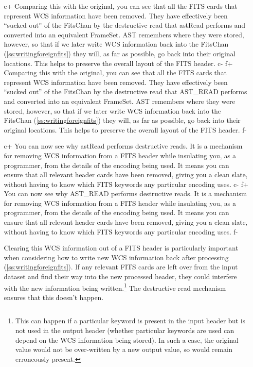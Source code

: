 \documentclass[twoside,11pt]{article}
\newcommand{\secref}[1]{\S\ref{#1}}
\renewcommand{\secref}[1]{\ref{#1}}
\begin{document}
c+
Comparing this with the original, you can see that all the FITS cards
that represent WCS information have been removed. They have
effectively been ``sucked out'' of the FitsChan by the destructive
read that astRead performs and converted into an equivalent
FrameSet. AST remembers where they were stored, however, so that if we
later write WCS information back into the FitsChan
(\secref{ss:writingforeignfits}) they will, as far as possible, go
back into their original locations. This helps to preserve the overall
layout of the FITS header.
c-
f+
Comparing this with the original, you can see that all the FITS cards
that represent WCS information have been removed. They have
effectively been ``sucked out'' of the FitsChan by the destructive
read that AST\_READ performs and converted into an equivalent
FrameSet. AST remembers where they were stored, however, so that if we
later write WCS information back into the FitsChan
(\secref{ss:writingforeignfits}) they will, as far as possible, go
back into their original locations.  This helps to preserve the
overall layout of the FITS header.
f-

c+
You can now see why astRead performs destructive reads. It is a
mechanism for removing WCS information from a FITS header while
insulating you, as a programmer, from the details of the encoding
being used. It means you can ensure that all relevant header cards
have been removed, giving you a clean slate, without having to know
which FITS keywords any particular encoding uses.
c-
f+
You can now see why AST\_READ performs destructive reads. It is a
mechanism for removing WCS information from a FITS header while
insulating you, as a programmer, from the details of the encoding
being used. It means you can ensure that all relevant header cards
have been removed, giving you a clean slate, without having to know
which FITS keywords any particular encoding uses.
f-

Clearing this WCS information out of a FITS header is particularly
important when considering how to write new WCS information back after
processing (\secref{ss:writingforeignfits}). If any relevant FITS
cards are left over from the input dataset and find their way into the
new processed header, they could interfere with the new information
being written.\footnote{This can happen if a particular keyword is
present in the input header but is not used in the output header
(whether particular keywords are used can depend on the WCS
information being stored). In such a case, the original value would
not be over-written by a new output value, so would remain erroneously
present.} The destructive read mechanism ensures that this doesn't
happen.
\end{document}
